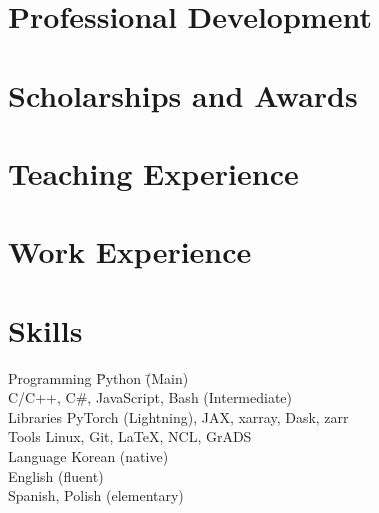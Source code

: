 \section{Professional Development}


\section{Scholarships and Awards}



\section{Teaching Experience}



\section{Work Experience}
% 


% 

\section{Skills}
 \begin{tabbing}
 Programming  \hspace{4 em} \= Python \hspace{23em}  \= (Main) \\
 \> C/C++, C\#, JavaScript, Bash \> (Intermediate) \\
 Libraries \> PyTorch (Lightning), JAX, xarray, Dask, zarr \\
 Tools \> Linux, Git, \LaTeX, NCL, GrADS \\
 Language \> Korean (native) \\
 \> English (fluent) \\
 \> Spanish, Polish (elementary) \\
 \end{tabbing}

